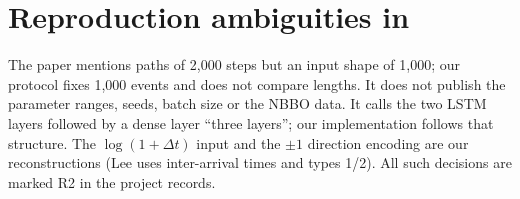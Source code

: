 \documentclass[preprint,12pt,authoryear]{elsarticle}
\begin{document}
\appendix

\section{Reproduction ambiguities in \texorpdfstring{\citet{lee2023}}{Lee (2023)}}
\label{app:lee}

The paper mentions paths of 2,000 steps but an input shape of 1,000; our protocol fixes
1,000 events and does not compare lengths. It does not publish the parameter ranges, seeds,
batch size or the NBBO data. It calls the two LSTM layers followed by a dense layer ``three
layers''; our implementation follows that structure. The $\log(1+\Delta t)$ input and the
$\pm1$ direction encoding are our reconstructions (Lee uses inter-arrival times and types
1/2). All such decisions are marked R2 in the project records.

\renewcommand{\bibfont}{\small}


\end{document}
